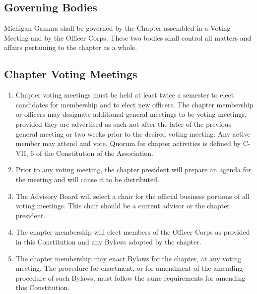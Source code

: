 \subsection{Governing Bodies} \label{III.1}
Michigan Gamma shall be governed by the Chapter assembled in a Voting Meeting and by the Officer Corps.
These two bodies shall control all matters and affairs pertaining to the chapter as a whole.

\subsection{Chapter Voting Meetings} \label{III.2}
\begin{enumerate}
\item {} 
Chapter voting meetings must be held at least twice a semester to elect candidates for membership and to elect new officers.
The chapter membership or officers may designate additional general meetings to be voting meetings, provided they are advertised as such not after the later of the previous general meeting or two weeks prior to the desired voting meeting.
Any active member may attend and vote.
Quorum for chapter activities is defined by C-VII, 6 of the Constitution of the Association.

\item {}
Prior to any voting meeting, the chapter president will prepare an agenda for the meeting and will cause it to be distributed.

\item {}
The Advisory Board will select a chair for the official business portions of all voting meetings.
This chair should be a current advisor or the chapter president.

\item {}
The chapter membership will elect members of the Officer Corps as provided in this Constitution and any Bylaws adopted by the chapter.

\item {}
The chapter membership may enact Bylaws for the chapter, at any voting meeting.
The procedure for enactment, or for amendment of the amending procedure of such Bylaws, must follow the same requirements for amending this Constitution.

\end{enumerate}

